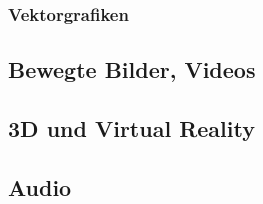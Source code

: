 \subsubsection{Vektorgrafiken}

\subsection{Bewegte Bilder, Videos}

\subsection{3D und Virtual Reality}

\subsection{Audio}